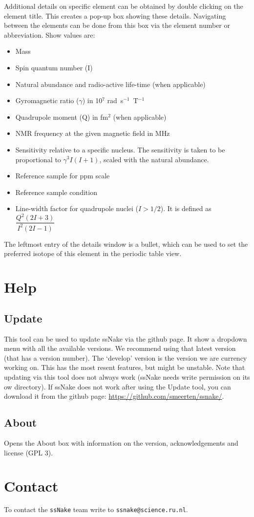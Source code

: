 \documentclass[11pt,a4paper]{article}
\begin{document}
Additional details on specific element can be obtained by double clicking on the element title. This creates a pop-up box showing these details. Navigating between the elements can be done from this box via the element number or abbreviation. Show values are:
\begin{itemize}
\item Mass
\item Spin quantum number (I)
\item Natural abundance and radio-active life-time (when applicable)
\item Gyromagnetic ratio ($\gamma$) in 10$^7$ rad~s$^{-1}$~T$^{-1}$
\item Quadrupole moment (Q) in fm$^2$ (when applicable)
\item NMR frequency at the given magnetic field in MHz
\item Sensitivity relative to a specific nucleus. The sensitivity is taken to be proportional to $\gamma^3 I (I+1)$, scaled with the natural abundance.
\item Reference sample for ppm scale
\item Reference sample condition
\item Line-width factor for quadrupole nuclei ($I > 1/2$). It is defined as $\dfrac{Q^2(2I+3)}{I^2(2I-1)}$
\end{itemize}
The leftmost entry of the details window is a bullet, which can be used to set the preferred isotope of this element in the periodic table view.






\section{Help}
\subsection{Update}
This tool can be used to update ssNake via the github page. It show a dropdown menu with all the available
versions. We recommend using that latest version (that has a version number). The `develop' version is the
version we are currency working on. This has the most resent features, but might be unstable. Note that updating via
this tool does not always work (ssNake needs write permission on its ow directory). If ssNake does not work
after using the Update tool, you can download it from the github page:
\url{https://github.com/smeerten/ssnake/}.

\subsection{About}
Opens the About box with information on the version, acknowledgements and license (GPL 3).

\section{Contact}
To contact the \texttt{ssNake} team write to \texttt{ssnake@science.ru.nl}.



\end{document}
